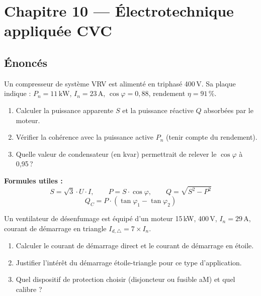 \chapter*{Chapitre 10 — Électrotechnique appliquée CVC}

\section*{Énoncés}


Un compresseur de système VRV est alimenté en triphasé 400\,V. Sa plaque indique : $P_n = 11\,\text{kW}$, $I_n = 23\,\text{A}$, $\cos\varphi = 0{,}88$, rendement $\eta = 91\,\%$.

\begin{enumerate}
  \item Calculer la puissance apparente $S$ et la puissance réactive $Q$ absorbées par le moteur.
  \item Vérifier la cohérence avec la puissance active $P_n$ (tenir compte du rendement).
  \item Quelle valeur de condensateur (en kvar) permettrait de relever le $\cos\varphi$ à 0,95\,?
\end{enumerate}

\textbf{Formules utiles :}
\[
  S = \sqrt{3} \cdot U \cdot I, \qquad P = S \cdot \cos\varphi, \qquad Q = \sqrt{S^2 - P^2}
\]
\[
  Q_C = P \cdot (\tan\varphi_1 - \tan\varphi_2)
\]


Un ventilateur de désenfumage est équipé d'un moteur 15\,kW, 400\,V, $I_n = 29\,\text{A}$, courant de démarrage en triangle $I_{d,\triangle} = 7 \times I_n$.

\begin{enumerate}
  \item Calculer le courant de démarrage direct et le courant de démarrage en étoile.
  \item Justifier l'intérêt du démarrage étoile-triangle pour ce type d'application.
  \item Quel dispositif de protection choisir (disjoncteur ou fusible aM) et quel calibre ?
\end{enumerate}

